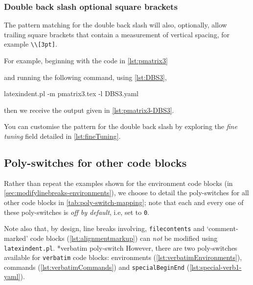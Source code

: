 \subsubsection{Double back slash optional square brackets}
	The pattern matching for the double back slash will also, optionally, allow trailing
	square brackets that contain a measurement of vertical spacing, for example
	\lstinline!\\[3pt]!.

	For example, beginning with the code in \cref{lst:pmatrix3}


	and running the following command, using \cref{lst:DBS3},
	\begin{commandshell}
latexindent.pl -m pmatrix3.tex -l DBS3.yaml
            \end{commandshell}
	then we receive the output given in \cref{lst:pmatrix3-DBS3}.


	You can customise the pattern for the double back slash by exploring the
	\emph{fine tuning} field detailed in \vref{lst:fineTuning}.

\subsection{Poly-switches for other code blocks}
	Rather than repeat the examples shown for the environment code blocks (in
	\vref{sec:modifylinebreaks-environments}), we choose to detail the poly-switches for all other code
	blocks in \cref{tab:poly-switch-mapping}; note that each and every one of these
	poly-switches is \emph{off by default}, i.e, set to \texttt{0}.

	Note also that, by design, line breaks involving, \texttt{filecontents} and
	`comment-marked' code blocks (\vref{lst:alignmentmarkup}) can
	\emph{not} be modified using
	\texttt{latexindent.pl}.%
	*{verbatim poly-switch} However, there are two poly-switches available for
	\texttt{verbatim} code blocks: environments (\vref{lst:verbatimEnvironments}),
	commands (\vref{lst:verbatimCommands}) and \texttt{specialBeginEnd} (\vref{lst:special-verb1-yaml}).

